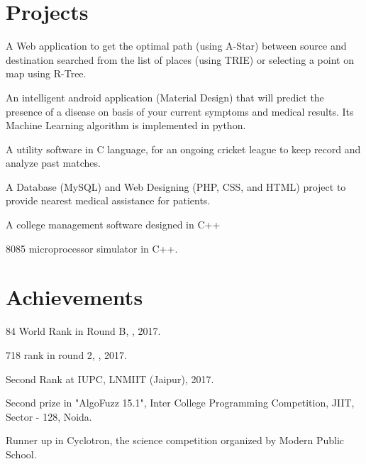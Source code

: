 \documentclass[]{hieudo-build}
\begin{document}
\begin{minipage}[t]{0.69\textwidth}
\section{Projects}

\descript{}
A Web application to get the optimal path (using A-Star) between source and destination searched from the list of places (using TRIE) or selecting a point on map using R-Tree.
\sectionsep

\descript{}
An intelligent android application (Material Design) that will predict the presence of a disease on basis of your current symptoms and medical results. Its Machine Learning algorithm is implemented in python.
\sectionsep

\descript{}
A utility software in C language, for an ongoing cricket league to keep record and analyze past matches.
\sectionsep 

\descript{}
A Database (MySQL) and Web Designing (PHP, CSS, and HTML) project to provide nearest medical assistance for patients.
\sectionsep

\descript{}
A college management software designed in C++%
\sectionsep 

\descript{}
8085 microprocessor simulator in C++.
\sectionsep 



\section{Achievements}

\vspace{0.5em} 
\begin{tightemize}

\item 84 World Rank in Round B, , 2017.
\item 718 rank in round 2, , 2017.
\item Second Rank at IUPC, LNMIIT (Jaipur), 2017.
\item Second prize in "AlgoFuzz 15.1", Inter College Programming Competition, JIIT, Sector - 128, Noida.
\item Runner up in Cyclotron, the science competition organized by Modern Public School.
\end{tightemize}
\sectionsep




\end{minipage}
\end{document}
